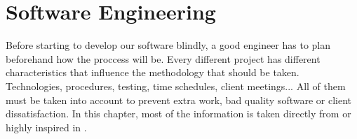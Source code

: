 \chapter{Software Engineering}

Before starting to develop our software blindly, a good engineer has to plan
beforehand how the proccess will be. Every different project has different
characteristics that influence the methodology that should be taken.
Technologies, procedures, testing, time schedules, client meetings... All of
them must be taken into account to prevent extra work, bad quality software or
client dissatisfaction. In this chapter, most of the information is taken
directly from \citet{Sommerville} or highly inspired in \citet{Mario_diaz}.








